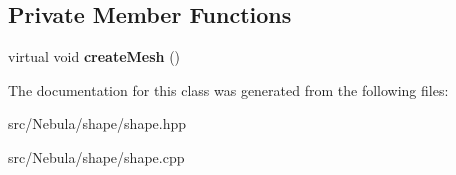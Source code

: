 \subsection*{\-Private \-Member \-Functions}
\begin{DoxyCompactItemize}
\item 
\hypertarget{classNeb_1_1Shape_1_1Sphere_1_1Sphere_a7159662417f302a1bb8125eba9302c4c}{virtual void {\bfseries create\-Mesh} ()}\label{classNeb_1_1Shape_1_1Sphere_1_1Sphere_a7159662417f302a1bb8125eba9302c4c}

\end{DoxyCompactItemize}


\-The documentation for this class was generated from the following files\-:\begin{DoxyCompactItemize}
\item 
src/\-Nebula/shape/shape.\-hpp\item 
src/\-Nebula/shape/shape.\-cpp\end{DoxyCompactItemize}
